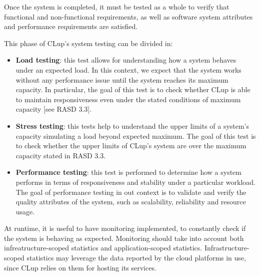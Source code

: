 \documentclass[../../main.tex]{subfiles}
\begin{document}
Once the system is completed, it must be tested as a whole to verify that functional and non-functional requirements, as well as software system attributes and performance requirements are satisfied.

This phase of CLup's system testing can be divided in:


\begin{itemize}

	\item \textbf{Load testing}: this test allows for understanding how a system behaves under an expected load. 
	In this context, we expect that the system works without any performance issue until the system reaches its maximum capacity. 
	In particular, the goal of this test is to check whether CLup is able to maintain responsiveness even under the stated conditions of maximum capacity [see RASD 3.3].

	\item \textbf{Stress testing}: this tests help to understand the upper limits of a system's capacity simulating a load beyond expected maximum. 
	The goal of this test is to check whether the upper limits of CLup's system are over the maximum capacity stated in RASD 3.3.

	\item \textbf{Performance testing}: this test is performed to determine how a system performs in terms of responsiveness and stability under a particular workload. 
	The goal of performance testing in out context is to validate and verify the quality attributes of the system, such as scalability, reliability and resource usage.
	

\end{itemize} 

At runtime, it is useful to have monitoring implemented, to constantly check if the system is behaving as expected. 
Monitoring should take into account both infreatructure-scoped statistics and application-scoped statistics. Infrastructure-scoped statistics may leverage the data reported by the cloud platforms in use, since CLup relies on them for hosting its services.

\end{document}

